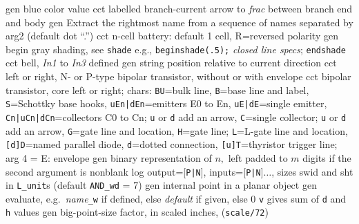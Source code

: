 %
  {gen}
  {blue color value}
  {cct}
  {labelled branch-current arrow to {\sl frac} between branch end and body
    }
  {gen}
  {Extract the rightmost name from a sequence of names separated by arg2
   (default dot ``.'')}
  {cct}
  {n-cell battery: default 1 cell,
  R=reversed polarity}
  {gen}
  {begin gray shading, see {\tt shade}
   e.g., {\tt beginshade(.5);} {\sl closed line specs}; {\tt endshade}}
  {cct}
  {bell, {\sl In1} to {\sl In3} defined
   }
  {gen}
  {string position relative to current direction}
  {cct}
  {left or right, N- or P-type bipolar transistor, without or with envelope 
    }
  {cct}
  { bipolar transistor, core left or right; chars:
   {\tt BU}=bulk line,
   {\tt B}=base line and label,
   {\tt S}=Schottky base hooks,
   {\tt uEn|dEn}=emitters E0 to En,
   {\tt uE|dE}=single emitter,
   {\tt Cn|uCn|dCn}=collectors C0 to Cn; {\tt u} or {\tt d} add an arrow,
   {\tt C}=single collector; {\tt u} or {\tt d} add an arrow,
   {\tt G}=gate line and location,
   {\tt H}=gate line; {\tt L}=L-gate line and location,
   {\tt [d]D}=named parallel diode,
   {\tt d}=dotted connection,
   {\tt [u]T}=thyristor trigger line;
   arg 4 = E: envelope
    }
  {gen}
  {binary representation of $n,$ left padded to $m$ digits if the second
   argument is nonblank}
  {log}
  {output=[{\tt P|N}], inputs=[{\tt P|N}]$\ldots$, sizes swid and sht
  in {\tt L\_unit}s (default {\tt AND\_wd} = 7)
    }
  {gen}
  {internal point in a planar object}
  {gen}
  {evaluate, e.g.\ {\sl name}{\tt \_w} if defined, else {\sl default\/}
   if given, else 0 {\tt v} gives sum of {\tt d} and {\tt h} values
     }
  {gen}
  {big-point-size factor, in scaled inches, ({\tt *scale/72})}
